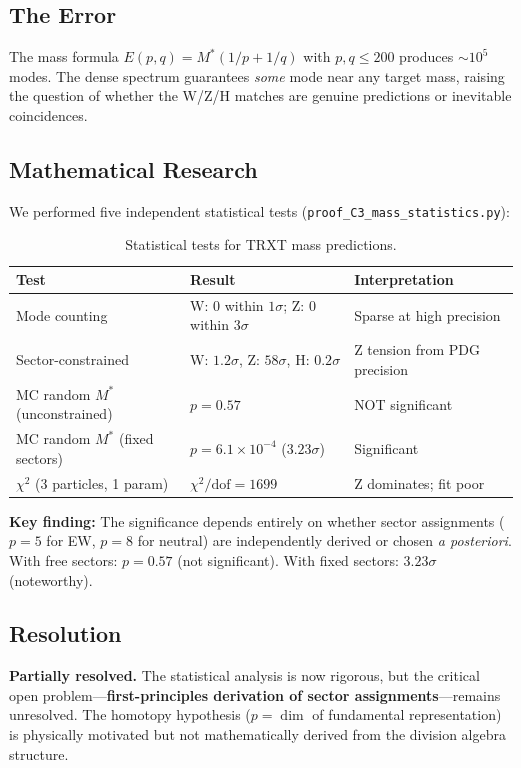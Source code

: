 \documentclass[11pt,a4paper]{article}
\begin{document}
\subsection{The Error}
The mass formula $E(p,q) = M^*(1/p + 1/q)$ with $p,q \le 200$ produces $\sim 10^5$ modes.  The dense spectrum guarantees \emph{some} mode near any target mass, raising the question of whether the W/Z/H matches are genuine predictions or inevitable coincidences.

\subsection{Mathematical Research}

We performed five independent statistical tests (\texttt{proof\_C3\_mass\_statistics.py}):

\begin{table}[h]
\centering
\small
\begin{tabular}{@{}lll@{}}
\toprule
\textbf{Test} & \textbf{Result} & \textbf{Interpretation} \\
\midrule
Mode counting & W: 0 within $1\sigma$; Z: 0 within $3\sigma$ & Sparse at high precision \\
Sector-constrained & W: $1.2\sigma$, Z: $58\sigma$, H: $0.2\sigma$ & Z tension from PDG precision \\
MC random $M^*$ (unconstrained) & $p = 0.57$ & NOT significant \\
MC random $M^*$ (fixed sectors) & $p = 6.1 \times 10^{-4}$ ($3.23\sigma$) & Significant \\
$\chi^2$ (3 particles, 1 param) & $\chi^2/\text{dof} = 1699$ & Z dominates; fit poor \\
\bottomrule
\end{tabular}
\caption{Statistical tests for TRXT mass predictions.}
\end{table}

\textbf{Key finding:} The significance depends entirely on whether sector assignments ($p = 5$ for EW, $p = 8$ for neutral) are independently derived or chosen \emph{a posteriori}.  With free sectors: $p = 0.57$ (not significant).  With fixed sectors: $3.23\sigma$ (noteworthy).

\subsection{Resolution}
\begin{mdframed}[backgroundcolor=yellow!10]
\textbf{Partially resolved.}  The statistical analysis is now rigorous, but the critical open problem---\textbf{first-principles derivation of sector assignments}---remains unresolved.  The homotopy hypothesis ($p = \dim$ of fundamental representation) is physically motivated but not mathematically derived from the division algebra structure.
\end{mdframed}
\end{document}
